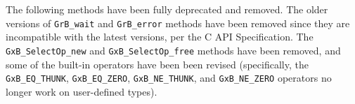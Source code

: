 The following methods have been fully deprecated and removed.  The older
versions of \verb'GrB_wait' and \verb'GrB_error' methods have been removed
since they are incompatible with the latest versions, per the C API
Specification.  The \verb'GxB_SelectOp_new' and \verb'GxB_SelectOp_free'
methods have been removed, and some of the built-in operators have been been
revised (specifically, the \verb'GxB_EQ_THUNK', \verb'GxB_EQ_ZERO',
\verb'GxB_NE_THUNK', and \verb'GxB_NE_ZERO' operators no longer work on
user-defined types).


